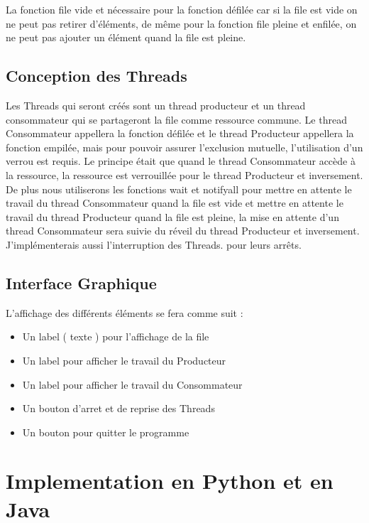 \documentclass{article}
\begin{document}
La fonction file vide et nécessaire pour la fonction défilée car si la file est vide on ne peut pas retirer d'éléments, de même pour la fonction file pleine et enfilée, on ne peut pas ajouter un élément quand la file est pleine.


\subsection{Conception des Threads}


Les Threads qui seront créés sont un thread producteur et un thread consommateur qui se partageront la file comme ressource commune. Le thread Consommateur appellera la fonction défilée et le thread Producteur appellera la fonction empilée, mais pour pouvoir assurer l'exclusion mutuelle, l'utilisation d'un verrou est requis. Le principe était que quand le thread Consommateur accède à la ressource, la ressource est verrouillée pour le thread Producteur et inversement. De plus nous utiliserons les fonctions wait et notifyall pour mettre en attente le travail du thread Consommateur quand la file est vide et mettre en attente le travail du thread Producteur quand la file est pleine, la mise en attente d'un thread Consommateur sera suivie du réveil du thread Producteur et inversement. J'implémenterais aussi l'interruption des Threads. pour leurs arrêts.
 \subsection{Interface Graphique}
 L'affichage des différents éléments se fera comme suit :
 
 \begin{itemize}
\item Un label ( texte ) pour l'affichage de la file
\item Un label pour afficher le travail du Producteur
\item Un label pour afficher le travail du Consommateur
\item Un bouton d'arret et de reprise des Threads
\item Un bouton pour quitter le programme
\end{itemize}
 
\section{Implementation en Python et en Java}
\end{document}

